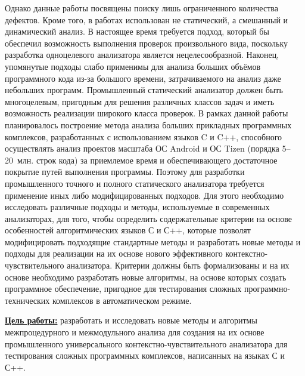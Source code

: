Однако данные работы посвящены поиску лишь ограниченного количества дефектов. Кроме того, в работах использован не статический, а смешанный и динамический анализ. В настоящее время требуется подход, который бы обеспечил возможность выполнения проверок произвольного вида, поскольку разработка одноцелевого анализатора является нецелесообразной. Наконец, упомянутые подходы слабо применимы для анализа больших объёмов программного кода из-за большого времени, затрачиваемого на анализ даже небольших программ. Промышленный статический анализатор должен быть многоцелевым, пригодным для решения различных классов задач и иметь возможность реализации широкого класса проверок. В рамках данной работы планировалось построение метода анализа больших прикладных программных комплексов, разработанных с использованием языков C и C++, способного осуществлять анализ проектов масштаба ОС Android и ОС Tizen (порядка 5--20~млн. строк кода) за приемлемое время и обеспечивающего достаточное покрытие путей выполнения программы. Поэтому для разработки промышленного точного и полного статического анализатора требуется применение иных либо модифицированных подходов. Для этого необходимо исследовать различные подходы  и методы, используемые в современных анализаторах, для того, чтобы определить  содержательные критерии  на основе особенностей алгоритмических языков С и С++,
которые позволят модифицировать подходящие стандартные методы и разработать новые методы и подходы  для реализации на их основе нового эффективного  контекстно-чувствительного анализатора.  Критерии  должны быть формализованы и на их основе необходимо разработать новые алгоритмы, на основе которых создать программное обеспечение, пригодное  для тестирования  сложных программно-технических комплексов в автоматическом режиме.  

\underline{\textbf{Цель работы:}} разработать и исследовать новые методы и алгоритмы межпроцедурного и межмодульного анализа для создания на их основе промышленного универсального контекстно-чувствительного анализатора для тестирования сложных программных комплексов, написанных на языках С и С++.


